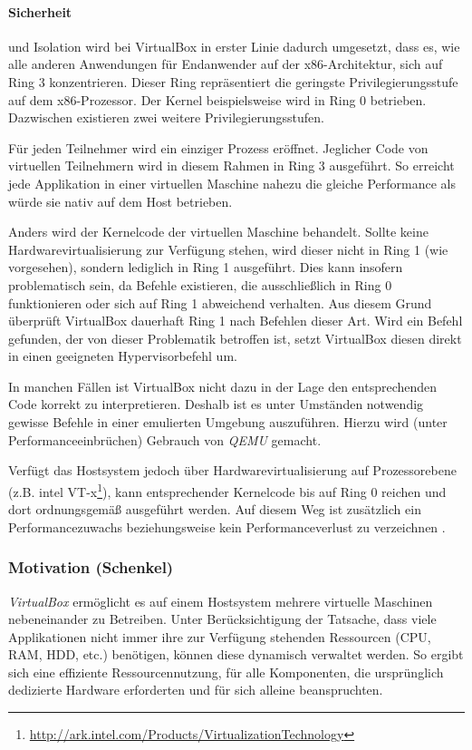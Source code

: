 \paragraph{Sicherheit} und Isolation wird bei VirtualBox in erster Linie dadurch umgesetzt, dass
es, wie alle anderen Anwendungen für Endanwender auf der x86-Architektur, sich auf Ring 3 konzentrieren.
Dieser Ring repräsentiert die geringste Privilegierungsstufe auf dem x86-Prozessor. Der Kernel
beispielsweise wird in Ring 0 betrieben. Dazwischen existieren zwei weitere Privilegierungsstufen.

Für jeden Teilnehmer wird ein einziger Prozess eröffnet. Jeglicher Code von virtuellen Teilnehmern
wird in diesem Rahmen in Ring 3 ausgeführt. So erreicht jede Applikation in einer virtuellen Maschine
nahezu die gleiche Performance als würde sie nativ auf dem Host betrieben.

Anders wird der Kernelcode der virtuellen Maschine behandelt. Sollte keine Hardwarevirtualisierung
zur Verfügung stehen, wird dieser nicht in Ring 1 (wie vorgesehen), sondern lediglich in Ring 1
ausgeführt. Dies kann insofern problematisch sein, da Befehle existieren, die ausschließlich
in Ring 0 funktionieren oder sich auf Ring 1 abweichend verhalten. Aus diesem Grund überprüft
VirtualBox dauerhaft Ring 1 nach Befehlen dieser Art. Wird ein Befehl gefunden, der von dieser
Problematik betroffen ist, setzt VirtualBox diesen direkt in einen geeigneten Hypervisorbefehl
um.

In manchen Fällen ist VirtualBox nicht dazu in der Lage den entsprechenden Code korrekt zu
interpretieren. Deshalb ist es unter Umständen notwendig gewisse Befehle in einer
emulierten Umgebung auszuführen. Hierzu wird (unter Performanceeinbrüchen) Gebrauch von
\textit{QEMU} gemacht. 

Verfügt das Hostsystem jedoch über Hardwarevirtualisierung auf Prozessorebene 
(z.B. intel VT-x\footnote{\url{http://ark.intel.com/Products/VirtualizationTechnology}}),
kann entsprechender Kernelcode bis auf Ring 0 reichen und dort ordnungsgemäß ausgeführt werden.
Auf diesem Weg ist zusätzlich
ein Performancezuwachs beziehungsweise kein Performanceverlust zu verzeichnen \cite{victor10}.

\subsubsection{Motivation (Schenkel)}
\textit{VirtualBox} ermöglicht es auf einem Hostsystem mehrere virtuelle Maschinen nebeneinander
zu Betreiben. Unter Berücksichtigung der Tatsache, dass viele Applikationen nicht immer ihre
zur Verfügung stehenden Ressourcen (CPU, RAM, HDD, etc.) benötigen, können diese dynamisch verwaltet
werden. So ergibt sich eine effiziente Ressourcennutzung, für alle Komponenten, die ursprünglich
dedizierte Hardware erforderten und für sich alleine beanspruchten.

